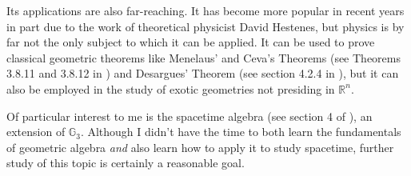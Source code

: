 \documentclass[twoside,10pt]{article}
\begin{document}
Its applications are also far-reaching. It has become more popular in recent years in part due to the work of theoretical physicist David Hestenes, but physics is by far not the only subject to which it can be applied. It can be used to prove classical geometric theorems like Menelaus' and Ceva's Theorems (see Theorems 3.8.11 and 3.8.12 in \cite{geo}) and Desargues' Theorem (see section 4.2.4 in \cite{survey}), but it can also be employed in the study of exotic geometries not presiding in $\mathbb{R}^{n}$.

Of particular interest to me is the spacetime algebra (see section 4 of \cite{survey}), an extension of $\mathbb{G}_{3}$. Although I didn't have the time to both learn the fundamentals of geometric algebra \textit{and} also learn how to apply it to study spacetime, further study of this topic is certainly a reasonable goal.

\nocite{hestenes}

\printbibliography
\end{document}
